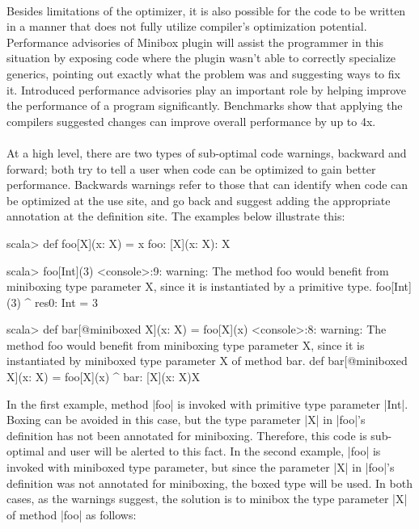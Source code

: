 \paragraph{}
Besides limitations of the optimizer, it is also possible for the code to be written in a manner that does not fully utilize compiler's optimization potential. Performance advisories of Minibox plugin will assist the programmer in this situation by exposing code where the plugin wasn't able to correctly specialize generics, pointing out exactly what the problem was and suggesting ways to fix it. Introduced performance advisories play an important role by helping improve the performance of a program significantly. Benchmarks show that applying the compilers suggested changes can improve overall performance by up to 4x.
\paragraph{}
At a high level, there are two types of sub-optimal code warnings, backward and forward; both try to tell a user when code can be optimized to gain better performance. Backwards warnings refer to those that can identify when code can be optimized at the use site, and go back and suggest adding the appropriate annotation at the definition site. The examples below illustrate this:

\begin{lstlisting-nobreak}
scala> def foo[X](x: X) = x
foo: [X](x: X): X

scala> foo[Int](3)
<console>:9: warning: The method foo would benefit from miniboxing type
parameter X, since it is instantiated by a primitive type.
              foo[Int](3)
                 ^
res0: Int = 3

scala> def bar[@miniboxed X](x: X) = foo[X](x)
<console>:8: warning: The method foo would benefit from miniboxing type
parameter X, since it is instantiated by miniboxed type parameter X of method bar.
       def bar[@miniboxed X](x: X) = foo[X](x)
                               ^
bar: [X](x: X)X
\end{lstlisting-nobreak}
In the first example, method |foo| is invoked with primitive type parameter |Int|. Boxing can be avoided in this case, but the type parameter |X| in |foo|'s definition has not been annotated for miniboxing. Therefore, this code is sub-optimal and user will be alerted to this fact. In the second example, |foo| is invoked with miniboxed type parameter, but since the parameter |X| in |foo|'s definition was not annotated for miniboxing, the boxed type will be used. In both cases, as the warnings suggest, the solution is to minibox the type parameter |X| of method |foo| as follows:

